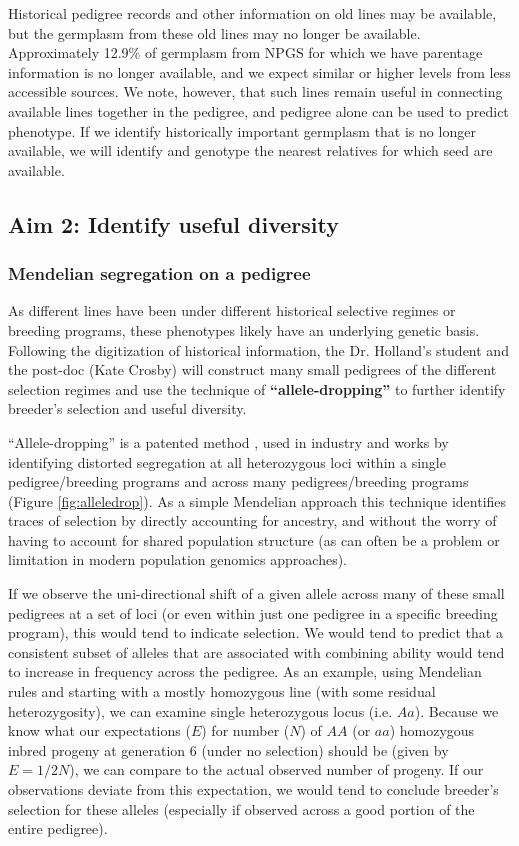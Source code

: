 \documentclass[12pt]{article}
\begin{document}
Historical pedigree records and other information on old lines may be available, but the germplasm from these old lines may no longer be available. 
Approximately 12.9\% of germplasm from NPGS for which we have parentage information is no longer available, and we expect similar or higher levels from less accessible sources. 
We note, however, that such lines remain useful in connecting available lines together in the pedigree, and pedigree alone can be used to predict phenotype. 
If we identify historically important germplasm that is no longer available, we will identify and genotype the nearest relatives for which seed are available. 

\subsection*{Aim 2: Identify useful diversity}

\subsubsection*{Mendelian segregation on a pedigree}
As different lines have been under different historical selective regimes or breeding programs, these phenotypes likely have an underlying genetic basis. Following the digitization of historical information, the Dr. Holland's student and the post-doc (Kate Crosby) will construct many small pedigrees of the different selection regimes and use the technique of \textbf{``allele-dropping''} to further identify breeder's selection and useful diversity. 

``Allele-dropping'' is a patented method \citep{sebastian1995method}, used in industry and works by identifying distorted segregation at all heterozygous loci within a single pedigree/breeding programs and across many pedigrees/breeding programs (Figure \ref{fig:alleledrop}). 
As a simple Mendelian approach this technique identifies traces of selection by directly accounting for ancestry, and without the worry of having to account for shared population structure \cite{sebastian1995method} (as can often be a problem or limitation in modern population genomics approaches). 

If we observe the uni-directional shift of a given allele across many of these small pedigrees at a set of loci (or even within just one pedigree in a specific breeding program), this would tend to indicate selection. 
We would tend to predict that a consistent subset of alleles that are associated with combining ability would tend to increase in frequency across the pedigree.
As an example, using Mendelian rules and starting with a mostly homozygous line (with some residual heterozygosity), we can examine single heterozygous locus (i.e. $Aa$). 
Because we know what our expectations ($E$) for number ($N$) of $AA$ (or $aa$) homozygous inbred progeny at generation 6 (under no selection) should be (given by $E = 1/2 N$), we can compare to the actual observed number of progeny. 
If our observations deviate from this expectation, we would tend to conclude breeder's selection for these alleles (especially if observed across a good portion of the entire pedigree). 
\end{document}
